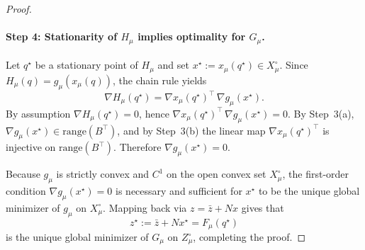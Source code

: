 \documentclass[11pt]{article}
\theoremstyle{plain}
\theoremstyle{definition}
\begin{document}
\begin{proof}
\paragraph{Step 4: Stationarity of $H_\mu$ implies optimality for $G_\mu$.}
Let $q^\star$ be a stationary point of $H_\mu$ and set $x^\star:=x_\mu(q^\star)\in X_\mu^\circ$.
Since $H_\mu(q)=g_\mu(x_\mu(q))$, the chain rule yields
\[
\nabla H_\mu(q^\star)=\nabla x_\mu(q^\star)^\top\,\nabla g_\mu(x^\star).
\]
By assumption $\nabla H_\mu(q^\star)=0$, hence $\nabla x_\mu(q^\star)^\top\,\nabla g_\mu(x^\star)=0$.
By Step~3(a), $\nabla g_\mu(x^\star)\in\mathrm{range}(B^\top)$, and by Step~3(b) the linear map
$\nabla x_\mu(q^\star)^\top$ is injective on $\mathrm{range}(B^\top)$. Therefore $\nabla g_\mu(x^\star)=0$.

Because $g_\mu$ is strictly convex and $C^1$ on the open convex set $X_\mu^\circ$, the first-order condition
$\nabla g_\mu(x^\star)=0$ is necessary and sufficient for $x^\star$ to be the unique global minimizer of
$g_\mu$ on $X_\mu^\circ$. Mapping back via $z=\bar z+Nx$ gives that
\[
z^\star:=\bar z+Nx^\star=F_\mu(q^\star)
\]
is the unique global minimizer of $G_\mu$ on $Z_\mu^\circ$, completing the proof.
\end{proof}
\end{document}
